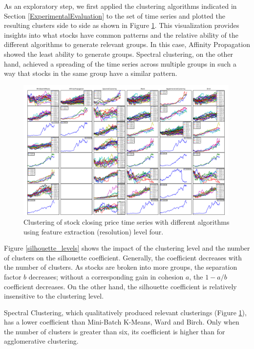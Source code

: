 \documentclass{article}
\begin{document}
As an exploratory step, we first applied the clustering algorithms indicated in Section \ref{ExperimentalEvaluation} to the set of time series and plotted the resulting clusters side to side as shown in Figure \ref{ClusterTimeSeries}. This visualization provides insights into what stocks have common patterns and the relative ability of the different algorithms to generate relevant groups. In this case, Affinity Propagation showed the least ability to generate groups. Spectral clustering, on the other hand, achieved a spreading of the time series across multiple groups in such a way that stocks in the same group have a similar pattern.


\begin{figure}
\includegraphics[width=0.99\textwidth]{../demo/CompleteGrid.pdf}
\caption{Clustering of stock closing price time series with different algorithms
using feature extraction (resolution) level four.}
\label{ClusterTimeSeries}
\end{figure}

Figure \ref{silhouette_levels} shows the impact of the clustering level and the number of clusters on the silhouette coefficient. Generally, the coefficient decreases with the number of clusters. As stocks are broken into more groups, the separation factor $b$ decreases; without a corresponding gain in cohesion $a$, the $1-a/b$ coefficient decreases. On the other hand, the silhouette coefficient is relatively insensitive to the clustering level.

Spectral Clustering, which qualitatively produced relevant clusterings (Figure \ref{ClusterTimeSeries}), has a lower coefficient than Mini-Batch K-Means, Ward and Birch. Only when the number of clusters is greater than six, its coefficient is higher than for agglomerative clustering.
\end{document}

